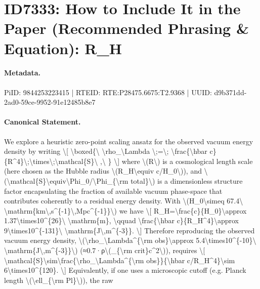 \section*{ID7333: How to Include It in the Paper (Recommended Phrasing \& Equation): R\_H}
\paragraph{Metadata.}
PiID: 9844253223415 | RTEID: RTE:P28475.6675:T2.9368 | UUID: d9b371dd-2ad0-59ce-9952-91e12485b8e7

\paragraph{Canonical Statement.}
We explore a heuristic zero-point scaling ansatz for the observed vacuum energy density by writing \textbackslash{}[ \textbackslash{}boxed\{\textbackslash{} \textbackslash{}rho\_\textbackslash{}Lambda \textbackslash{};=\textbackslash{}; \textbackslash{}frac\{\textbackslash{}hbar c\}\{R\textasciicircum{}4\}\textbackslash{};\textbackslash{}times\textbackslash{};\textbackslash{}mathcal\{S\}\textbackslash{} ,\textbackslash{} \} \textbackslash{}] where \textbackslash{}(R\textbackslash{}) is a cosmological length scale (here chosen as the Hubble radius \textbackslash{}(R\_H\textbackslash{}equiv c/H\_0\textbackslash{})), and \textbackslash{}(\textbackslash{}mathcal\{S\}\textbackslash{}equiv\textbackslash{}Phi\_0/\textbackslash{}Phi\_\{\textbackslash{}rm total\}\textbackslash{}) is a dimensionless structure factor encapsulating the fraction of available vacuum phase-space that contributes coherently to a residual energy density. With \textbackslash{}(H\_0\textbackslash{}simeq 67.4\textbackslash{} \textbackslash{}mathrm\{km\textbackslash{},s\textasciicircum{}\{-1\}\textbackslash{},Mpc\textasciicircum{}\{-1\}\}\textbackslash{}) we have \textbackslash{}[ R\_H=\textbackslash{}frac\{c\}\{H\_0\}\textbackslash{}approx 1.37\textbackslash{}times10\textasciicircum{}\{26\}\textbackslash{} \textbackslash{}mathrm\{m\}, \textbackslash{}qquad \textbackslash{}frac\{\textbackslash{}hbar c\}\{R\_H\textasciicircum{}4\}\textbackslash{}approx 9\textbackslash{}times10\textasciicircum{}\{-131\}\textbackslash{} \textbackslash{}mathrm\{J\textbackslash{},m\textasciicircum{}\{-3\}\}. \textbackslash{}] Therefore reproducing the observed vacuum energy density, \textbackslash{}(\textbackslash{}rho\_\textbackslash{}Lambda\textasciicircum{}\{\textbackslash{}rm obs\}\textbackslash{}approx 5.4\textbackslash{}times10\textasciicircum{}\{-10\}\textbackslash{} \textbackslash{}mathrm\{J\textbackslash{},m\textasciicircum{}\{-3\}\}\textbackslash{}) (≈0.7·ρ\textbackslash{}(\_\{\textbackslash{}rm crit\}c\textasciicircum{}2\textbackslash{})), requires \textbackslash{}[ \textbackslash{}mathcal\{S\}\textbackslash{}sim\textbackslash{}frac\{\textbackslash{}rho\_\textbackslash{}Lambda\textasciicircum{}\{\textbackslash{}rm obs\}\}\{\textbackslash{}hbar c/R\_H\textasciicircum{}4\}\textbackslash{}sim 6\textbackslash{}times10\textasciicircum{}\{120\}. \textbackslash{}] Equivalently, if one uses a microscopic cutoff (e.g. Planck length \textbackslash{}(\textbackslash{}ell\_\{\textbackslash{}rm Pl\}\textbackslash{})), the raw 